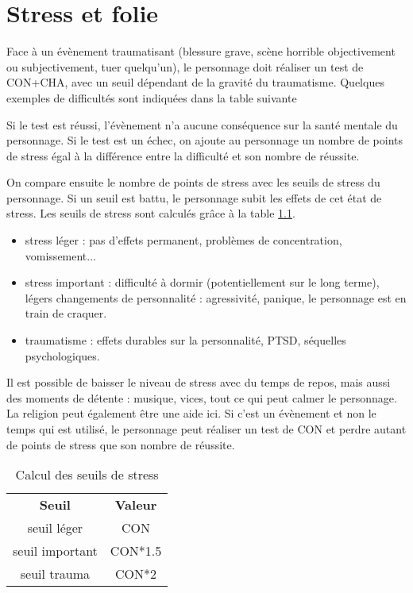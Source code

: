 \documentclass[10pt,a4paper,twocolumn]{book}
\begin{document}
\chapter{Stress et folie}
Face à un évènement traumatisant (blessure grave, scène horrible objectivement ou subjectivement, tuer quelqu'un), le personnage doit réaliser un test de CON+CHA, avec un seuil dépendant de la gravité du traumatisme. Quelques exemples de difficultés sont indiquées dans la table suivante %

Si le test est réussi, l'évènement n'a aucune conséquence sur la santé mentale du personnage. Si le test est un échec, on ajoute au personnage un nombre de points de stress égal à la différence entre la difficulté et son nombre de réussite.

On compare ensuite le nombre de points de stress avec les seuils de stress du personnage. Si un seuil est battu, le personnage subit les effets de cet état de stress. Les seuils de stress sont calculés grâce à la table \ref{TableauSeuilsStress}.

\begin{itemize}
\item stress léger : pas d'effets permanent, problèmes de concentration, vomissement...
\item stress important : difficulté à dormir (potentiellement sur le long terme), légers changements de personnalité : agressivité, panique, le personnage est en train de craquer.
\item traumatisme : effets durables sur la personnalité, PTSD, séquelles psychologiques.
\end{itemize}

Il est possible de baisser le niveau de stress avec du temps de repos, mais aussi des moments de détente : musique, vices, tout ce qui peut calmer le personnage. La religion peut également être une aide ici.
Si c'est un évènement et non le temps qui est utilisé, le personnage peut réaliser un test de CON et perdre autant de points de stress que son nombre de réussite.
\begin{table}
\label{TableauSeuilsStress}
\caption{Calcul des seuils de stress}
\begin{center}
\begin{tabular}{cc}
\textbf{Seuil} & \textbf{Valeur} \\
seuil léger & CON \\
seuil important & CON*1.5 \\
seuil trauma & CON*2 \\
\end{tabular}
\end{center}
\end{table}
\end{document}
